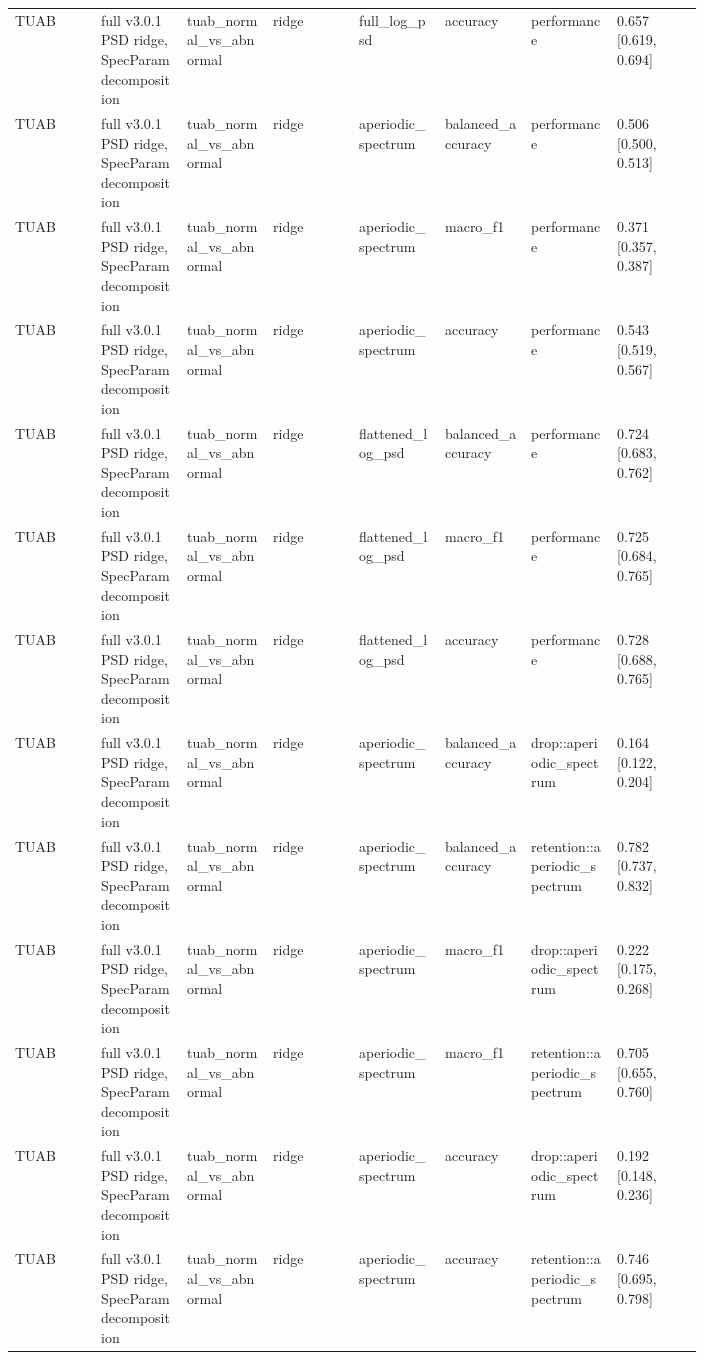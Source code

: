 \begin{longtable}{p{0.10\linewidth}p{0.10\linewidth}p{0.10\linewidth}p{0.10\linewidth}p{0.10\linewidth}p{0.10\linewidth}p{0.10\linewidth}p{0.10\linewidth}}
TUAB & full v3.0.1 PSD ridge, SpecParam decomposition & tuab\_normal\_vs\_abnormal & ridge & full\_log\_psd & accuracy & performance & 0.657 [0.619, 0.694]\\
TUAB & full v3.0.1 PSD ridge, SpecParam decomposition & tuab\_normal\_vs\_abnormal & ridge & aperiodic\_spectrum & balanced\_accuracy & performance & 0.506 [0.500, 0.513]\\
TUAB & full v3.0.1 PSD ridge, SpecParam decomposition & tuab\_normal\_vs\_abnormal & ridge & aperiodic\_spectrum & macro\_f1 & performance & 0.371 [0.357, 0.387]\\
TUAB & full v3.0.1 PSD ridge, SpecParam decomposition & tuab\_normal\_vs\_abnormal & ridge & aperiodic\_spectrum & accuracy & performance & 0.543 [0.519, 0.567]\\
TUAB & full v3.0.1 PSD ridge, SpecParam decomposition & tuab\_normal\_vs\_abnormal & ridge & flattened\_log\_psd & balanced\_accuracy & performance & 0.724 [0.683, 0.762]\\
TUAB & full v3.0.1 PSD ridge, SpecParam decomposition & tuab\_normal\_vs\_abnormal & ridge & flattened\_log\_psd & macro\_f1 & performance & 0.725 [0.684, 0.765]\\
TUAB & full v3.0.1 PSD ridge, SpecParam decomposition & tuab\_normal\_vs\_abnormal & ridge & flattened\_log\_psd & accuracy & performance & 0.728 [0.688, 0.765]\\
TUAB & full v3.0.1 PSD ridge, SpecParam decomposition & tuab\_normal\_vs\_abnormal & ridge & aperiodic\_spectrum & balanced\_accuracy & drop::aperiodic\_spectrum & 0.164 [0.122, 0.204]\\
TUAB & full v3.0.1 PSD ridge, SpecParam decomposition & tuab\_normal\_vs\_abnormal & ridge & aperiodic\_spectrum & balanced\_accuracy & retention::aperiodic\_spectrum & 0.782 [0.737, 0.832]\\
TUAB & full v3.0.1 PSD ridge, SpecParam decomposition & tuab\_normal\_vs\_abnormal & ridge & aperiodic\_spectrum & macro\_f1 & drop::aperiodic\_spectrum & 0.222 [0.175, 0.268]\\
TUAB & full v3.0.1 PSD ridge, SpecParam decomposition & tuab\_normal\_vs\_abnormal & ridge & aperiodic\_spectrum & macro\_f1 & retention::aperiodic\_spectrum & 0.705 [0.655, 0.760]\\
TUAB & full v3.0.1 PSD ridge, SpecParam decomposition & tuab\_normal\_vs\_abnormal & ridge & aperiodic\_spectrum & accuracy & drop::aperiodic\_spectrum & 0.192 [0.148, 0.236]\\
TUAB & full v3.0.1 PSD ridge, SpecParam decomposition & tuab\_normal\_vs\_abnormal & ridge & aperiodic\_spectrum & accuracy & retention::aperiodic\_spectrum & 0.746 [0.695, 0.798]\\

\end{longtable}
